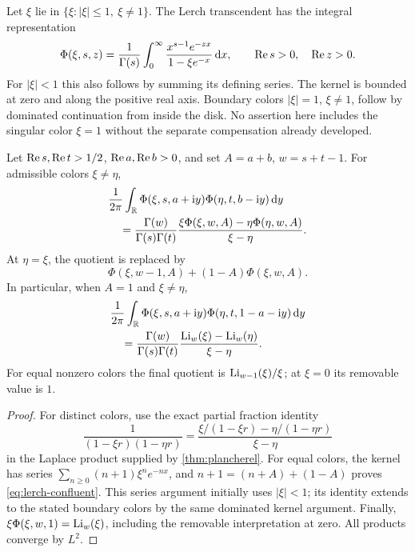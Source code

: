 Let $\xi$ lie in $\{\xi:|\xi|\le1,\ \xi\ne1\}$. The Lerch transcendent
has the integral representation \cite{dlmf-lerch}
\begin{equation}\label{eq:lerch-laplace}
 \Phi(\xi,s,z)=\frac1{\Gamma(s)}\int_0^\infty
           \frac{x^{s-1}e^{-zx}}{1-\xi e^{-x}}\,\mathrm d x,
 \qquad\operatorname{Re} s>0,\quad\operatorname{Re} z>0.
\end{equation}
For $|\xi|<1$ this also follows by summing its defining series.
The kernel is bounded at zero and along the positive real axis. Boundary
colors $|\xi|=1$, $\xi\ne1$, follow by dominated continuation from inside
the disk. No assertion here includes the singular color $\xi=1$ without
the separate compensation already developed.

\begin{theorem}\label{thm:lerch}
Let $\operatorname{Re} s,\operatorname{Re} t>1/2$, $\operatorname{Re} a,\operatorname{Re} b>0$, and set
$A=a+b$, $w=s+t-1$. For admissible colors $\xi\ne\eta$,
\begin{align}
 &\frac1{2\pi}\int_{\mathbb R}\Phi(\xi,s,a+\mathrm i y)
                             \Phi(\eta,t,b-\mathrm i y)\,\mathrm d y\notag\\
 &\quad=\frac{\Gamma(w)}{\Gamma(s)\Gamma(t)}
           \frac{\xi\Phi(\xi,w,A)-\eta\Phi(\eta,w,A)}{\xi-\eta}.
               \label{eq:lerch-distinct}
\end{align}
At $\eta=\xi$, the quotient is replaced by
\begin{equation}\label{eq:lerch-confluent}
 \Phi(\xi,w-1,A)+(1-A)\Phi(\xi,w,A).
\end{equation}
In particular, when $A=1$ and $\xi\ne\eta$,
\begin{align}
 &\frac1{2\pi}\int_{\mathbb R}\Phi(\xi,s,a+\mathrm i y)
                             \Phi(\eta,t,1-a-\mathrm i y)\,\mathrm d y\notag\\
 &\quad=\frac{\Gamma(w)}{\Gamma(s)\Gamma(t)}
                 \frac{\operatorname{Li}_w(\xi)-\operatorname{Li}_w(\eta)}{\xi-\eta}.
                     \label{eq:polylog-divdiff}
\end{align}
For equal nonzero colors the final quotient is $\operatorname{Li}_{w-1}(\xi)/\xi$;
at $\xi=0$ its removable value is $1$.
\end{theorem}
\begin{proof}
For distinct colors, use the exact partial fraction identity
\[
 \frac1{(1-\xi r)(1-\eta r)}
 =\frac{\xi/(1-\xi r)-\eta/(1-\eta r)}{\xi-\eta}
\]
in the Laplace product supplied by \cref{thm:plancherel}.
For equal colors, the kernel has series
$\sum_{n\ge0}(n+1)\xi^n e^{-nx}$, and
$n+1=(n+A)+(1-A)$ proves \eqref{eq:lerch-confluent}.
This series argument initially uses $|\xi|<1$; its identity extends to
the stated boundary colors by the same dominated kernel argument.
Finally, $\xi\Phi(\xi,w,1)=\operatorname{Li}_w(\xi)$, including the removable
interpretation at zero. All products converge by $L^2$.
\end{proof}

